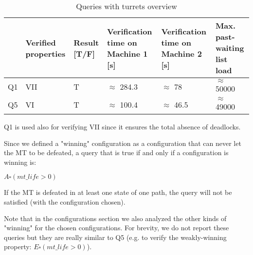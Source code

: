 \documentclass[
10pt, %
a4paper, %
oneside, %
headinclude,footinclude, %
BCOR5mm, %
]{scrartcl}
\begin{document}
				\begin{table}[H]
					\centering
					\begin{tabularx}{\textwidth}{||c|>{\raggedright\arraybackslash}X|>{\raggedright\arraybackslash}X|>{\raggedright\arraybackslash}X|>{\raggedright\arraybackslash}X|>{\raggedright\arraybackslash}X||}
						\hline
						& Verified properties & Result [T/F] & Verification time on Machine 1 [s] & Verification time on Machine 2 [s] & Max. past-waiting list load \\
						\hline
						Q1 & VII & T & $\approx$ 284.3 & $\approx$ 78 & $\approx$ 50000\\ \hline
						Q5 & VI & T &  $\approx$ 100.4 & $\approx$ 46.5 & $\approx$ 49000  \\
						\hline
					\end{tabularx}
					\caption{Queries with turrets overview}
				\end{table}
				
				Q1 is used also for verifying VII since it ensures the total absence of deadlocks.
				
				Since we defined a "winning" configuration as a configuration that can never let the MT to be defeated, a query that is true if and only if a configuration is winning is:
				\begin{center}
					$A\square(mt\_life>0)$	
				\end{center}
				If the MT is defeated in at least one state of one path, the query will not be satisfied (with the configuration chosen).
				
				Note that in the configurations section we also analyzed the other kinds of "winning" for the chosen configurations. For brevity, we do not report these queries but they are really similar to Q5 (e.g. to verify the weakly-winning property: $E\square(mt\_life>0)$).
\end{document}
